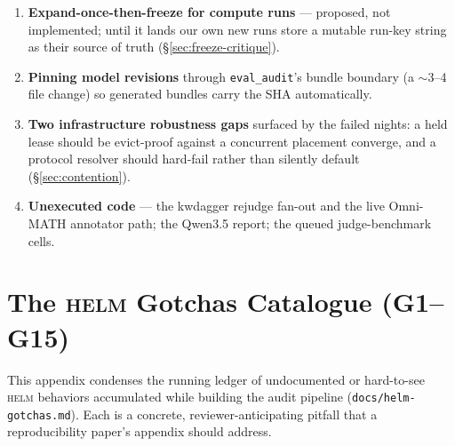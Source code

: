 \documentclass[11pt]{report}
\newcommand{\code}[1]{\texttt{#1}}
\newcommand{\file}[1]{\texttt{#1}}
\begin{document}
\begin{enumerate}[nosep]
  \item \textbf{Expand-once-then-freeze for compute runs} --- proposed, not
        implemented; until it lands our own new runs store a mutable run-key string
        as their source of truth (\S\ref{sec:freeze-critique}).
  \item \textbf{Pinning model revisions} through \code{eval\_audit}'s bundle boundary
        (a $\sim$3--4 file change) so generated bundles carry the SHA automatically.
  \item \textbf{Two infrastructure robustness gaps} surfaced by the failed nights: a
        held lease should be evict-proof against a concurrent placement converge, and
        a protocol resolver should hard-fail rather than silently default
        (\S\ref{sec:contention}).
  \item \textbf{Unexecuted code} --- the kwdagger rejudge fan-out and the live
        Omni-MATH annotator path; the Qwen3.5 report; the queued judge-benchmark
        cells.
\end{enumerate}

\appendix
\chapter{The \textsc{helm} Gotchas Catalogue (G1--G15)}
\label{app:gotchas}

This appendix condenses the running ledger of undocumented or hard-to-see
\textsc{helm} behaviors accumulated while building the audit pipeline
(\file{docs/helm-gotchas.md}). Each is a concrete, reviewer-anticipating pitfall
that a reproducibility paper's appendix should address.
\end{document}
